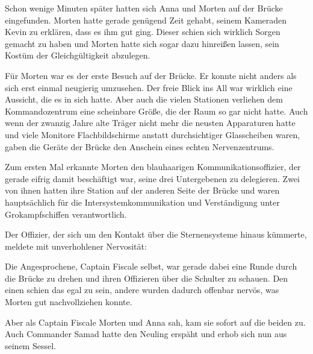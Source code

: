 Schon wenige Minuten später hatten sich Anna und Morten auf der Brücke eingefunden. Morten hatte gerade genügend Zeit gehabt, seinem Kameraden Kevin zu erklären, dass es ihm gut ging. Dieser schien sich wirklich Sorgen gemacht zu haben und Morten hatte sich sogar dazu hinreißen lassen, sein Kostüm der Gleichgültigkeit abzulegen.

\par

Für Morten war es der erste Besuch auf der Brücke. Er konnte nicht anders als sich erst einmal neugierig umzusehen. Der freie Blick ins All war wirklich eine Aussicht, die es in sich hatte. Aber auch die vielen Stationen verliehen dem Kommandozentrum eine scheinbare Größe, die der Raum so gar nicht hatte. Auch wenn der zwanzig Jahre alte Träger nicht mehr die neusten Apparaturen hatte und viele Monitore Flachbildschirme anstatt durchsichtiger Glasscheiben waren, gaben die Geräte der Brücke den Anschein eines echten Nervenzentrums.

\par

Zum ersten Mal erkannte Morten den blauhaarigen Kommunikationsoffizier, der gerade eifrig damit beschäftigt war, seine drei Untergebenen zu delegieren. Zwei von ihnen hatten ihre Station auf der anderen Seite der Brücke und waren hauptsächlich für die Intersystemkommunikation und Verständigung unter Grokampfschiffen verantwortlich.

\par

Der Offizier, der sich um den Kontakt über die Sternensysteme hinaus kümmerte, meldete mit unverhohlener Nervosität: 

\par

Die Angesprochene, Captain Fiscale selbst, war gerade dabei eine Runde durch die Brücke zu drehen und ihren Offizieren über die Schulter zu schauen. Den einen schien das egal zu sein, andere wurden dadurch offenbar nervös, was Morten gut nachvollziehen konnte.

\par

Aber als Captain Fiscale Morten und Anna sah, kam sie sofort auf die beiden zu. Auch Commander Samad hatte den Neuling erspäht und erhob sich nun aus seinem Sessel.

\par

